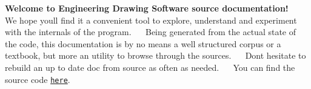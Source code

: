 {\bfseries Welcome to Engineering Drawing Software source documentation!}~\newline
~\newline
We hope you\textquotesingle{}ll find it a convenient tool to explore, understand and experiment with the internals of the program.~\newline
~\newline
Being generated from the actual state of the code, this documentation is by no means a well structured corpus or a textbook, but more an utility to browse through the sources.~\newline
~\newline
Don\textquotesingle{}t hesitate to rebuild an up to date doc from source as often as needed.~\newline
~\newline
You can find the source code \href{https://www.github.com}{\tt here}. 